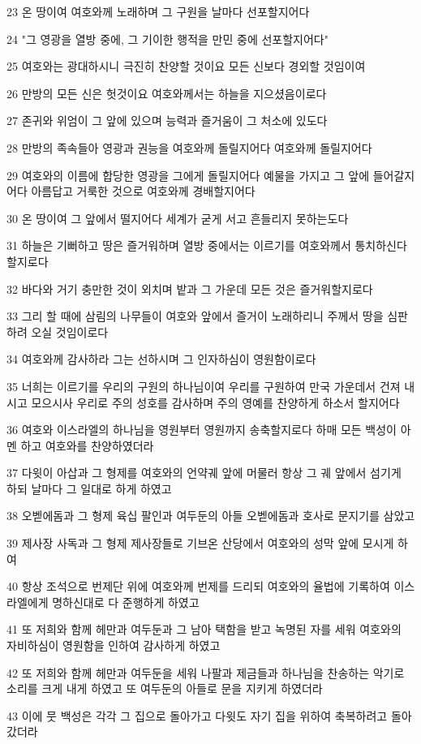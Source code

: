 \par 23 온 땅이여 여호와께 노래하며 그 구원을 날마다 선포할지어다
\par 24 "그 영광을 열방 중에, 그 기이한 행적을 만민 중에 선포할지어다"
\par 25 여호와는 광대하시니 극진히 찬양할 것이요 모든 신보다 경외할 것임이여
\par 26 만방의 모든 신은 헛것이요 여호와께서는 하늘을 지으셨음이로다
\par 27 존귀와 위엄이 그 앞에 있으며 능력과 즐거움이 그 처소에 있도다
\par 28 만방의 족속들아 영광과 권능을 여호와께 돌릴지어다 여호와께 돌릴지어다
\par 29 여호와의 이름에 합당한 영광을 그에게 돌릴지어다 예물을 가지고 그 앞에 들어갈지어다 아름답고 거룩한 것으로 여호와께 경배할지어다
\par 30 온 땅이여 그 앞에서 떨지어다 세계가 굳게 서고 흔들리지 못하는도다
\par 31 하늘은 기뻐하고 땅은 즐거워하며 열방 중에서는 이르기를 여호와께서 통치하신다 할지로다
\par 32 바다와 거기 충만한 것이 외치며 밭과 그 가운데 모든 것은 즐거워할지로다
\par 33 그리 할 때에 삼림의 나무들이 여호와 앞에서 즐거이 노래하리니 주께서 땅을 심판하려 오실 것임이로다
\par 34 여호와께 감사하라 그는 선하시며 그 인자하심이 영원함이로다
\par 35 너희는 이르기를 우리의 구원의 하나님이여 우리를 구원하여 만국 가운데서 건져 내시고 모으시사 우리로 주의 성호를 감사하며 주의 영예를 찬양하게 하소서 할지어다
\par 36 여호와 이스라엘의 하나님을 영원부터 영원까지 송축할지로다 하매 모든 백성이 아멘 하고 여호와를 찬양하였더라
\par 37 다윗이 아삽과 그 형제를 여호와의 언약궤 앞에 머물러 항상 그 궤 앞에서 섬기게 하되 날마다 그 일대로 하게 하였고
\par 38 오벧에돔과 그 형제 육십 팔인과 여두둔의 아들 오벧에돔과 호사로 문지기를 삼았고
\par 39 제사장 사독과 그 형제 제사장들로 기브온 산당에서 여호와의 성막 앞에 모시게 하여
\par 40 항상 조석으로 번제단 위에 여호와께 번제를 드리되 여호와의 율법에 기록하여 이스라엘에게 명하신대로 다 준행하게 하였고
\par 41 또 저희와 함께 헤만과 여두둔과 그 남아 택함을 받고 녹명된 자를 세워 여호와의 자비하심이 영원함을 인하여 감사하게 하였고
\par 42 또 저희와 함께 헤만과 여두둔을 세워 나팔과 제금들과 하나님을 찬송하는 악기로 소리를 크게 내게 하였고 또 여두둔의 아들로 문을 지키게 하였더라
\par 43 이에 뭇 백성은 각각 그 집으로 돌아가고 다윗도 자기 집을 위하여 축복하려고 돌아갔더라

